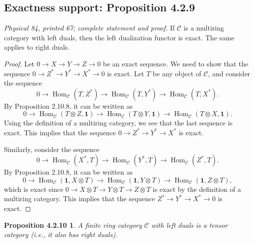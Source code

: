 \documentclass[11pt]{article}
\DeclareMathOperator{\Hom}{Hom}
\newcommand{\Cat}{\mathcal C}
\newcommand{\unit}{\mathbf 1}
\newtheorem*{primaryprop}{Proposition 4.2.10}
\begin{document}
\subsection*{Exactness support: Proposition 4.2.9}
\noindent\emph{Physical 84, printed 67; complete statement and proof.}
If $\Cat$ is a multiring category with left duals, then the left
dualization functor is exact. The same applies to right duals.
\begin{proof}
Let $0\to X\to Y\to Z\to0$ be an exact sequence. We need to show
that the sequence $0\to Z^*\to Y^*\to X^*\to0$ is exact. Let $T$
be any object of $\Cat$, and consider the sequence
\[
0\to\Hom_{\Cat}(T,Z^*)\to\Hom_{\Cat}(T,Y^*)\to\Hom_{\Cat}(T,X^*).
\]
By Proposition 2.10.8, it can be written as
\[
0\to\Hom_{\Cat}(T\otimes Z,\unit)
\to\Hom_{\Cat}(T\otimes Y,\unit)
\to\Hom_{\Cat}(T\otimes X,\unit).
\]
Using the definition of a multiring category, we see that the last
sequence is exact. This implies that the sequence
$0\to Z^*\to Y^*\to X^*$ is exact.

Similarly, consider the sequence
\[
0\to\Hom_{\Cat}(X^*,T)\to\Hom_{\Cat}(Y^*,T)\to\Hom_{\Cat}(Z^*,T).
\]
By Proposition 2.10.8, it can be written as
\[
0\to\Hom_{\Cat}(\unit,X\otimes T)
\to\Hom_{\Cat}(\unit,Y\otimes T)
\to\Hom_{\Cat}(\unit,Z\otimes T),
\]
which is exact since $0\to X\otimes T\to Y\otimes T\to Z\otimes T$
is exact by the definition of a multiring category. This implies that
the sequence $Z^*\to Y^*\to X^*\to0$ is exact.
\end{proof}

\begin{primaryprop}
A finite ring category $\Cat$ with left duals is a tensor category
(i.e., it also has right duals).
\end{primaryprop}
\end{document}
